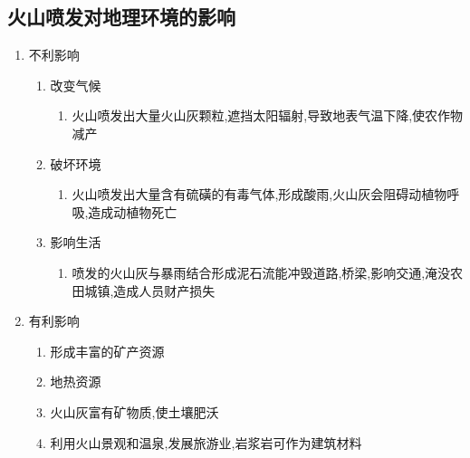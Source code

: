 \documentclass[a4paper]{article}
\begin{document}
    \subsection{火山喷发对地理环境的影响}
    \begin{enumerate}
        \item 不利影响
        \begin{enumerate}
            \item 改变气候
            \begin{enumerate}
                \item 火山喷发出大量火山灰颗粒,遮挡太阳辐射,导致地表气温下降,使农作物减产
            \end{enumerate}
            \item 破坏环境
            \begin{enumerate}
                \item 火山喷发出大量含有硫磺的有毒气体,形成酸雨,火山灰会阻碍动植物呼吸,造成动植物死亡
            \end{enumerate}
            \item 影响生活
            \begin{enumerate}
                \item 喷发的火山灰与暴雨结合形成泥石流能冲毁道路,桥梁,影响交通,淹没农田城镇,造成人员财产损失
            \end{enumerate}
        \end{enumerate}
        \item 有利影响
        \begin{enumerate}
            \item 形成丰富的矿产资源
            \item 地热资源
            \item 火山灰富有矿物质,使土壤肥沃
            \item 利用火山景观和温泉,发展旅游业,岩浆岩可作为建筑材料
        \end{enumerate}
    \end{enumerate}
\end{document}
